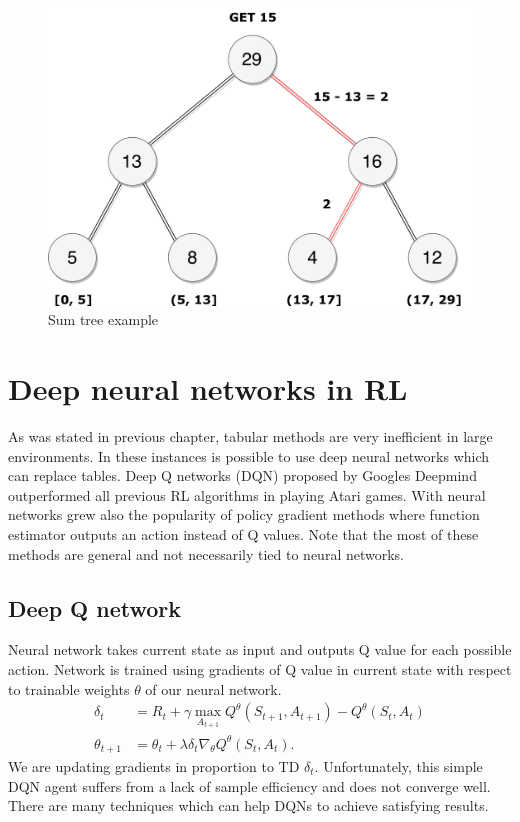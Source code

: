 \begin{figure}[H]
\centering
\includegraphics[scale=0.55]{fig/sumtree.pdf}
\caption{Sum tree example}
\label{fig:sumtree}
\end{figure}
\clearpage
\section{Deep neural networks in RL}
As was stated in previous chapter, tabular methods are very inefficient in large environments. In these instances is possible to use deep neural networks which can replace tables. Deep Q networks (DQN) proposed by Googles Deepmind \cite{mnih2015} outperformed all previous RL algorithms in playing Atari games. With neural networks grew also the popularity of policy gradient methods where function estimator outputs an action instead of Q values. Note that the most of these methods are general and not necessarily tied to neural networks.

\subsection{Deep Q network}
Neural network takes current state as input and outputs Q value for each possible action. Network is trained using gradients of Q value in current state with respect to trainable weights $\theta$ of our neural network.
\begin{align} \label{eq:qlearn}
\delta_t &= R_{t} + \gamma \underset{A_{t+1}}{\max}Q^\theta(S_{t+1}, A_{t+1}) - Q^\theta(S_t, A_t)\\
\theta_{t+1} &= \theta_t + \lambda \delta_t \nabla_\theta Q^\theta (S_t, A_t).
\end{align}
We are updating gradients in proportion to TD $\delta_t$. Unfortunately, this simple DQN agent suffers from a lack of sample efficiency and does not converge well. There are many techniques which can help DQNs to achieve satisfying results.

